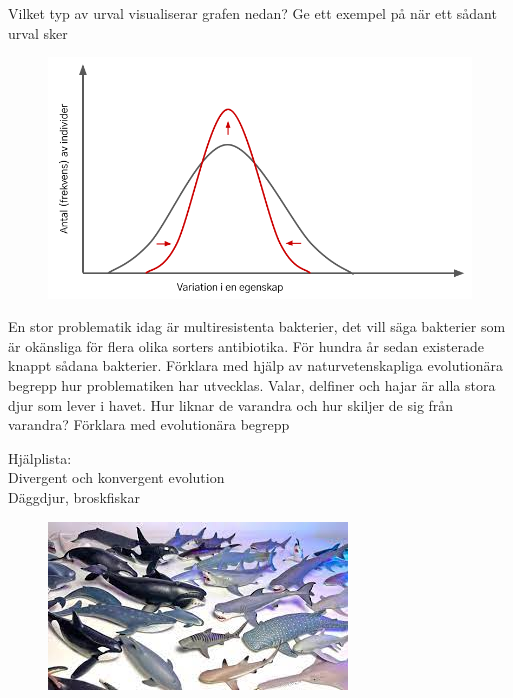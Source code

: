 \documentclass{exam}
\begin{document}
\begin{questions}
\vspace{10mm}
\question
Vilket typ av urval visualiserar grafen nedan? Ge ett exempel på när ett sådant urval sker

\begin{figure}[h]
    \centering
    \includegraphics[width=0.7\linewidth]{06f57399-163d-4981-a6b3-9370f8174f29.png}
\end{figure}
\break
\vspace{5mm} %
\begin{center}
\end{center}
\question En stor problematik idag är multiresistenta bakterier, det vill säga bakterier som är okänsliga för flera olika sorters antibiotika. För hundra år sedan existerade knappt sådana bakterier. Förklara med hjälp av naturvetenskapliga evolutionära begrepp hur problematiken har utvecklas.
\vspace{50mm}
\question
Valar, delfiner och hajar är alla stora djur som lever i havet. Hur liknar de varandra och hur skiljer de sig från varandra? Förklara med evolutionära begrepp

Hjälplista:\\
Divergent och konvergent evolution\\
Däggdjur, broskfiskar\\
\begin{figure}[h]
    \centering
    \includegraphics[width=0.4\linewidth]{download.jpeg}
\end{figure}

\break


\end{questions}
\end{document}
